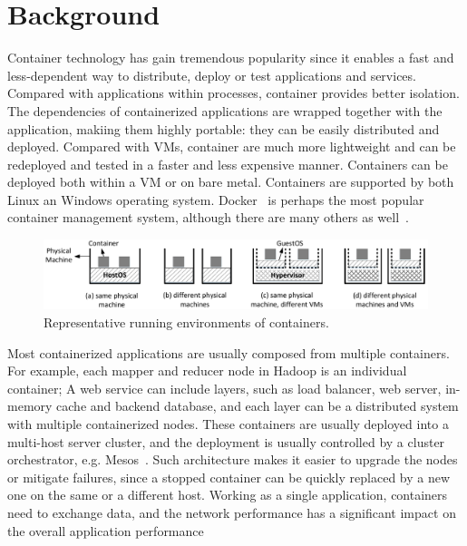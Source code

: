 \section{Background}
\label{sec:motivation}

Container technology has gain tremendous popularity since it enables a fast and
less-dependent way to distribute, deploy or test applications and services.
Compared with applications within processes, container provides better
isolation. The dependencies of containerized applications are wrapped together
with the application, makiing them highly portable: they can be easily
distributed and deployed.  Compared with VMs, container are much more
lightweight and can be redeployed and tested in a faster and less expensive
manner. Containers can be deployed both within a VM or on bare metal. Containers
are supported by both Linux an Windows operating system.  Docker~\cite{docker} is
perhaps the most popular container management system, although there are many
others as well~\cite{coreos,kubernetes}.

\begin{figure}  
	\centering   
	\includegraphics[width=6.7in]{figures/deployment-cases.pdf}   
	\caption{\label{fig:deploy-cases} Representative running environments of containers.}   
\end{figure}

Most containerized applications are usually composed from multiple containers.
For example, each mapper and reducer node in Hadoop \cite{hadoop} is an individual container; A
web service can include layers, such as load balancer, web server, in-memory
cache and backend database, and each layer can be a distributed system with
multiple containerized nodes. These containers are usually deployed into a
multi-host server cluster, and the deployment is usually controlled by a cluster
orchestrator, e.g. Mesos~\cite{mesos}.  Such architecture makes it easier to
upgrade the nodes or mitigate failures, since a stopped container can be quickly
replaced by a new one on the same or a different host.  Working as a single
application, containers need to exchange data, and the network performance has a
significant impact on the overall application performance~\cite{coflow-etc.}

